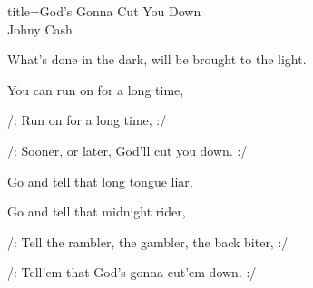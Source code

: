 \begin{song}{title=\centering God's Gonna Cut You Down \\\normalsize Johny Cash \vspace*{-0.3cm}}
{What's done in the dark, will be brought to the light. 

\sloka
You can run on for a long time, 

/: Run on for a long time, :/ 

/: Sooner, or later, God'll cut you down. :/ 

\sloka
Go and tell that long tongue liar, 

Go and tell that midnight rider, 

/: Tell the rambler, the gambler, the back biter, :/ 

/: Tell'em that God's gonna  cut'em down. :/ 

}
\setcounter{Slokočet}{0}
\end{song}

